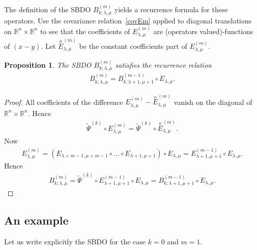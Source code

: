 \documentclass[10pt,a4paper]{amsart}
\numberwithin{equation}{section}
\newtheorem{prop}[theor]{Proposition}
\begin{document}
The definition of the SBDO $B_{k;\lambda, \mu}^{(m)}$ yields a recurrence formula for these operators. Use the covariance relation~\eqref{covEm} applied to diagonal translations on $\mathbb R^n\times \mathbb R^n$ to see that the coefficients of $E_{\lambda,\mu}^{(m)}$ are (operators valued)-functions of $(x-y)$. Let $\overset{o}{E}^{(m)}_{\lambda,\mu}$ be the constant coefficients part of $E_{\lambda,\mu}^{(m)}$.

\begin{prop} The SBDO $B_{k;\lambda,\mu}^{(m)}$ satisfies the recurrence relation
\begin{gather*}
B_{k;\lambda,\mu}^{(m)} = B_{k;\lambda+1,\mu+1}^{(m-1)}\circ E_{\lambda,\mu} .
\end{gather*}
\end{prop}

\begin{proof}

All coefficients of the difference $E_{\lambda,\mu}^{(m)}-\overset{o}{E}^{(m)}_{\lambda,\mu}$ vanish on the diagonal of $\mathbb R^n\times \mathbb R^n$. Hence
\begin{gather*}
\widetilde \Psi^{(k)} \circ E_{\lambda,\mu}^{(m)} = \widetilde \Psi^{(k)} \circ \overset{o}{E}_{\lambda,\mu}^{(m)}.
\end{gather*}
Now
\begin{gather*}
E_{\lambda,\mu}^{(m)} = \left(E_{\lambda+m-1, \mu+m-1}\circ \dots \circ E_{\lambda+1,\mu+1} \right)\circ E_{\lambda,\mu}
= E_{\lambda+1,\mu+1}^{(m-1)} \circ E_{\lambda, \mu}.
\end{gather*}
Hence
\begin{gather*}
B_{k;\lambda, \mu}^{(m)} = \widetilde \Psi^{(k)} \circ E_{\lambda+1, \mu+1}^{(m-1)}\circ E_{\lambda,\mu} = B_{k;\lambda+1,\mu+1}^{(m-1)}\circ E_{\lambda,\mu}.\tag*{\qed}
\end{gather*}
\renewcommand{\qed}{}
\end{proof}

\subsection{An example}

Let us write explicitly the SBDO for the case $k=0$ and $m=1$.
\end{document}
